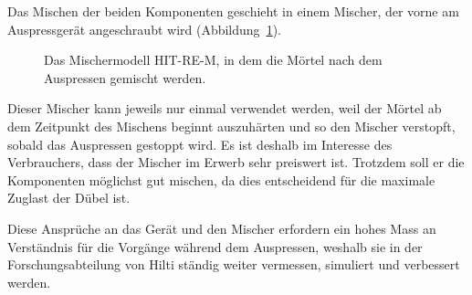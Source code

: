 Das Mischen der beiden Komponenten geschieht in einem Mischer, der vorne am Auspressgerät angeschraubt wird (Abbildung~\ref{fig:Mischer}).
%
\begin{figure}
    \centering
    \caption{Das Mischermodell HIT-RE-M, in dem die Mörtel nach dem Auspressen gemischt werden.}
    \label{fig:Mischer}
\end{figure}
%
Dieser Mischer kann jeweils nur einmal verwendet werden, weil der Mörtel ab dem Zeitpunkt des Mischens beginnt auszuhärten und so den Mischer verstopft, sobald das Auspressen gestoppt wird. Es ist deshalb im Interesse des Verbrauchers, dass der Mischer im Erwerb sehr preiswert ist. Trotzdem soll er die Komponenten möglichst gut mischen, da dies entscheidend für die maximale Zuglast der Dübel ist.

Diese Ansprüche an das Gerät und den Mischer erfordern ein hohes Mass an Verständnis für die Vorgänge während dem Auspressen, weshalb sie in der Forschungsabteilung von Hilti ständig weiter vermessen, simuliert und verbessert werden.
%
